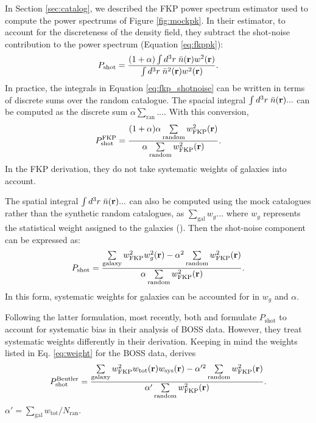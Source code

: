 \documentclass{emulateapj}
\begin{document}
In Section \ref{sec:catalog}, we described the FKP power spectrum estimator used to compute the power spectrums of Figure \ref{fig:mockpk}. In their estimator, to account for the discreteness of the density field, they subtract the shot-noise contribution to the power spectrum (Equation \ref{eq:fkppk}): 
\begin{equation} \label{eq:fkp_shotnoise}
P_\mathrm{shot} = \frac{ (1+\alpha) \int d^3r \;\bar{n}({\bf r})w^2({\bf r})}{\int d^3r \;\bar{n}^2({\bf r})w^2({\bf r})}. 
\end{equation}
In practice, the integrals in Equation \ref{eq:fkp_shotnoise} can be written in terms of discrete sums over the random catalogue. The spacial integral $\int d^3r \; \bar{n}({\bf r}) ...$ can be computed as the discrete sum $\alpha \sum_{\mathrm{ran}}...$. With this conversion,
\begin{equation}
P^\mathrm{FKP}_\mathrm{shot} = \frac{(1+\alpha) \alpha \sum\limits_{\mathrm{random}} w_\mathrm{FKP}^2({\bf r})}{\alpha \sum\limits_{\mathrm{random}}w_\mathrm{FKP}^2({\bf r})}.
\end{equation} 
In the FKP derivation, they do not take systematic weights of galaxies into account.

The spatial integral $\int d^3r \;\bar{n}({\bf r})...$ can also be computed using the mock catalogues rather than the synthetic random catalogues, as $\sum_{\mathrm{gal}} w_g...$ where $w_g$ represents the statistical weight assigned to the galaxies (\citealt{Cole:2005aa, Yamamoto:2006aa, Beutler:2014aa, Gil-Marin:2014aa}). Then the shot-noise component can be expressed as: 
\begin{equation} \label{eq:fkpweight}
P_\mathrm{shot} = \frac{ \sum\limits_{\mathrm{galaxy}} w^2_\mathrm{FKP}w^2_g({\bf r})- \alpha^2 \sum\limits_{\mathrm{random}} w_\mathrm{FKP}^2({\bf r})}{\alpha \sum\limits_{\mathrm{random}}w_\mathrm{FKP}^2({\bf r})}.
\end{equation}
In this form, systematic weights for galaxies can be accounted for in $w_g$ and $\alpha$. 

Following the latter formulation, most recently, both \cite{Beutler:2014aa} and \cite{Gil-Marin:2014aa} formulate $P_\mathrm{shot}$ to account for systematic bias in their analysis of BOSS data. However, they treat systematic weights differently in their derivation. Keeping in mind the weights listed in Eq. \ref{eq:weight} for the BOSS data, \cite{Beutler:2014aa} derives
\begin{equation} \label{eq:florian}
P^\mathrm{Beutler}_\mathrm{shot} = \frac{\sum\limits_{\mathrm{galaxy}} w^2_\mathrm{FKP}w_\mathrm{tot}({\bf r})w_\mathrm{sys}({\bf r}) - \alpha'^2 \sum\limits_{\mathrm{random}} w_\mathrm{FKP}^2({\bf r})}{\alpha' \sum\limits_{\mathrm{random}}w_\mathrm{FKP}^2({\bf r})}.
\end{equation}
$\alpha' = \sum_\mathrm{gal} w_\mathrm{tot} / N_\mathrm{ran}$. 
\end{document}

